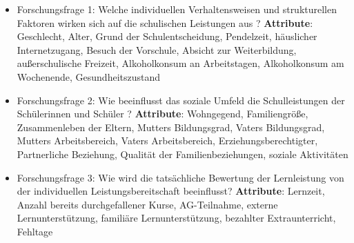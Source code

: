 \begin{itemize}
    \item Forschungsfrage 1: Welche individuellen Verhaltensweisen und strukturellen Faktoren wirken sich auf die schulischen Leistungen aus ?
        \subitem \textbf{Attribute}: Geschlecht, Alter, Grund der Schulentscheidung, Pendelzeit, häuslicher Internetzugang, Besuch der Vorschule, Absicht zur Weiterbildung, außerschulische Freizeit, Alkoholkonsum an Arbeitstagen, Alkoholkonsum am Wochenende, Gesundheitszustand
    \item Forschungsfrage 2: Wie beeinflusst das soziale Umfeld die Schulleistungen der Schülerinnen und Schüler ? 
        \subitem \textbf{Attribute}: Wohngegend, Familiengröße, Zusammenleben der Eltern, Mutters Bildungsgrad, Vaters Bildungsgrad, Mutters Arbeitsbereich, Vaters Arbeitsbereich, Erziehungsberechtigter, Partnerliche Beziehung, Qualität der Familienbeziehungen, soziale Aktivitäten
    \item Forschungsfrage 3: Wie wird die tatsächliche Bewertung der Lernleistung von der individuellen Leistungsbereitschaft beeinflusst?
        \subitem \textbf{Attribute}: Lernzeit, Anzahl bereits durchgefallener Kurse, AG-Teilnahme, externe Lernunterstützung, familiäre Lernunterstützung, bezahlter Extraunterricht, Fehltage
\end{itemize}




